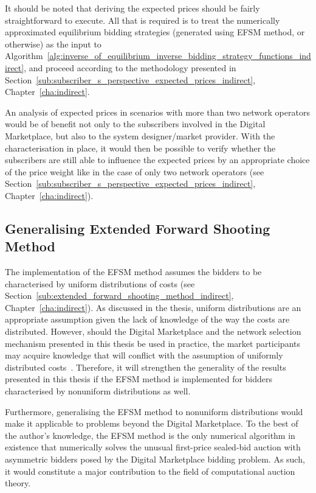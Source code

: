 It should be noted that deriving the expected prices should be fairly straightforward to execute. All that is required is to treat the numerically approximated equilibrium bidding strategies (generated using EFSM method, or otherwise) as the input to Algorithm~\ref{alg:inverse_of_equilibrium_inverse_bidding_strategy_functions_indirect}, and proceed according to the methodology presented in Section~\ref{sub:subscriber_s_perspective_expected_prices_indirect}, Chapter~\ref{cha:indirect}.

An analysis of expected prices in scenarios with more than two network operators would be of benefit not only to the subscribers involved in the Digital Marketplace, but also to the system designer/market provider. With the characterisation in place, it would then be possible to verify whether the subscribers are still able to influence the expected prices by an appropriate choice of the price weight like in the case of only two network operators (see Section~\ref{sub:subscriber_s_perspective_expected_prices_indirect}, Chapter~\ref{cha:indirect}).

\subsection{Generalising Extended Forward Shooting Method}
\label{sub:generalising_extended_forward_shooting_method_conclusions}
The implementation of the EFSM method assumes the bidders to be characterised by uniform distributions of costs (see Section~\ref{sub:extended_forward_shooting_method_indirect}, Chapter~\ref{cha:indirect}). As discussed in the thesis, uniform distributions are an appropriate assumption given the lack of knowledge of the way the costs are distributed. However, should the Digital Marketplace and the network selection mechanism presented in this thesis be used in practice, the market participants may acquire knowledge that will conflict with the assumption of uniformly distributed costs~\cite{Chung2004}. Therefore, it will strengthen the generality of the results presented in this thesis if the EFSM method is implemented for bidders characterised by nonuniform distributions as well.

Furthermore, generalising the EFSM method to nonuniform distributions would make it applicable to problems beyond the Digital Marketplace. To the best of the author's knowledge, the EFSM method is the only numerical algorithm in existence that numerically solves the unusual first-price sealed-bid auction with asymmetric bidders posed by the Digital Marketplace bidding problem. As such, it would constitute a major contribution to the field of computational auction theory.

